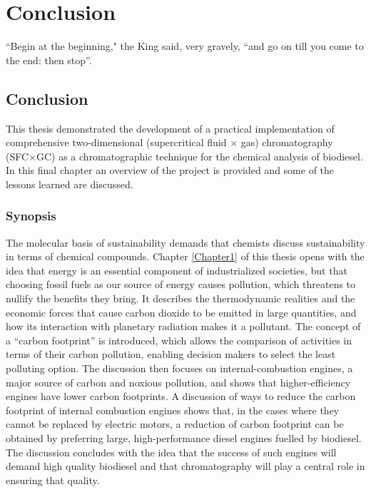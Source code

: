 \part{Conclusion}
\label{sec:Part4}

\begin{savequote}[\quotewidth]
``Begin at the beginning," the King said, very gravely, ``and go on till you come to the end: then stop''.
\end{savequote}

\chapter{Conclusion} %
\label{Chapter9}


This thesis demonstrated the development of a practical implementation of
comprehensive two-dimensional (supercritical fluid × gas) chromatography
(SFC×GC) as a chromatographic technique for the chemical analysis of biodiesel.
In this final chapter an overview of the project is provided and some of the
lessons learned are discussed.

\section{Synopsis}

The molecular basis of sustainability \autocite{Anastas2016} demands that
chemists discuss sustainability in terms of chemical compounds. Chapter
\ref{Chapter1} of this thesis opens with the idea that energy is an essential
component of industrialized societies, but that choosing fossil fuels as our
source of energy causes pollution, which threatens to nullify the benefits they
bring. It describes the thermodynamic realities and the economic forces that
cause carbon dioxide to be emitted in large quantities, and how its interaction
with planetary radiation makes it a pollutant. The concept of a ``carbon
footprint'' is introduced, which allows the comparison of activities in terms of
their carbon pollution, enabling decision makers to select the least polluting
option. The discussion then focuses on internal-combustion engines, a major
source of carbon and noxious pollution, and shows that higher-efficiency engines
have lower carbon footprints. A discussion of ways to reduce the carbon
footprint of internal combustion engines shows that, in the cases where they
cannot be replaced by electric motors, a reduction of carbon footprint can be
obtained by preferring large, high-performance diesel engines fuelled by
biodiesel. The discussion concludes with the idea that the success of such
engines will demand high quality biodiesel and that chromatography will play a
central role in ensuring that quality.

